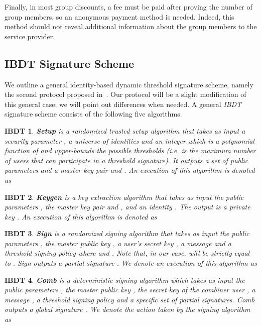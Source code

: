 \documentclass[11pt]{llncs}
\newtheorem{ibdtproto}{IBDT}
\begin{document}
Finally, in most group discounts, a fee must
be paid after proving the number of group members,
so an anonymous payment method is needed.
Indeed, this method should not reveal additional
information about the group members
to the service provider.


\subsection{IBDT Signature Scheme}\label{ab.subsec.ibdt}

We outline a general
identity-based dynamic threshold signature scheme, namely
the second protocol proposed in~\cite{ab.Herranz2012}.
Our protocol will be a slight modification of this general
case; we will point out differences when needed.
A general \emph{IBDT} signature scheme
consists of the following five algorithms.

\begin{ibdtproto}\label{ab.ibdtproto.setup}
\textbf{Setup} is a randomized trusted setup algorithm
that takes as input a security parameter ,
a universe of identities  and an integer 
which is a polynomial function of  and upper-bounds
the possible thresholds
(\emph{i.e.}  is the maximum number of users that can participate
in a threshold signature).
It outputs a set of public parameters 
and a master key pair  and .
An execution of this algorithm is denoted as

\end{ibdtproto}

\begin{ibdtproto}\label{ab.ibdtproto.keygen}
\textbf{Keygen} is a key extraction algorithm that
takes as input the public parameters ,
the master key pair  and ,
and an identity .
The output is a private key .
An execution of this algorithm is denoted as

\end{ibdtproto}

\begin{ibdtproto}\label{ab.ibdtproto.sign}
\textbf{Sign} is a randomized signing algorithm
that takes as input the public parameters ,
the master public key , a user's secret key ,
a message  and
a threshold signing policy
 where  and .
Note that, in our case,  will be strictly equal to .
Sign outputs a partial signature .
We denote an execution of this algorithm as

\end{ibdtproto}

\begin{ibdtproto}\label{ab.ibdtproto.comb}
\textbf{Comb} is a deterministic signing algorithm
which takes as input the public parameters ,
the master public key , 
the secret key of the
combiner user , 
a message ,
a threshold signing policy  and
a specific set  of  partial signatures.
Comb outputs a global signature .
We denote the action taken by the signing algorithm as

\end{ibdtproto}
\end{document}

